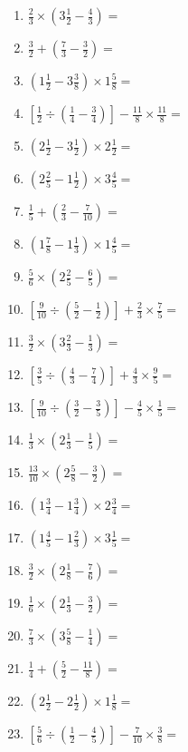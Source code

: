 \documentclass[12pt]{article}
\begin{document}
\begin{enumerate}[ itemsep=1.5cm]
	\item $\displaystyle \frac{2}{3} \times \left( 3 \frac{1}{2} - \frac{4}{3} \right) =$
	\item $\displaystyle \frac{3}{2} + \left( \frac{7}{3} - \frac{3}{2} \right) =$
	\item $\displaystyle \left( 1 \frac{1}{2} - 3 \frac{3}{8} \right) \times 1 \frac{5}{8} =$
	\item $\displaystyle \left[ \frac{1}{2} \div \left( \frac{1}{4} - \frac{3}{4} \right) \right] - \frac{11}{8} \times \frac{11}{8} =$
	\item $\displaystyle \left( 2 \frac{1}{2} - 3 \frac{1}{2} \right) \times 2 \frac{1}{2} =$
	\item $\displaystyle \left( 2 \frac{2}{5} - 1 \frac{1}{2} \right) \times 3 \frac{4}{5} =$
	\item $\displaystyle \frac{1}{5} + \left( \frac{2}{3} - \frac{7}{10} \right) =$
	\item $\displaystyle \left( 1 \frac{7}{8} - 1 \frac{1}{3} \right) \times 1 \frac{4}{5} =$
	\item $\displaystyle \frac{5}{6} \times \left( 2 \frac{2}{5} - \frac{6}{5} \right) =$

	\item $\displaystyle \left[ \frac{9}{10} \div \left( \frac{5}{2} - \frac{1}{2} \right) \right] + \frac{2}{3} \times \frac{7}{5} =$
	\item $\displaystyle \frac{3}{2} \times \left( 3 \frac{2}{3} - \frac{1}{3} \right) =$
	\item $\displaystyle \left[ \frac{3}{5} \div \left( \frac{4}{3} - \frac{7}{4} \right) \right] + \frac{4}{3} \times \frac{9}{5} =$
	\item $\displaystyle \left[ \frac{9}{10} \div \left( \frac{3}{2} - \frac{3}{5} \right) \right] - \frac{4}{5} \times \frac{1}{5} =$
	\item $\displaystyle \frac{1}{3} \times \left( 2 \frac{1}{3} - \frac{1}{5} \right) =$
	\item $\displaystyle \frac{13}{10} \times \left( 2 \frac{5}{8} - \frac{3}{2} \right) =$
	\item $\displaystyle \left( 1 \frac{3}{4} - 1 \frac{3}{4} \right) \times 2 \frac{3}{4} =$
	\item $\displaystyle \left( 1 \frac{4}{5} - 1 \frac{2}{3} \right) \times 3 \frac{1}{5} =$
	\item $\displaystyle \frac{3}{2} \times \left( 2 \frac{1}{8} - \frac{7}{6} \right) =$

	\item $\displaystyle \frac{1}{6} \times \left( 2 \frac{1}{3} - \frac{3}{2} \right) =$
	\item $\displaystyle \frac{7}{3} \times \left( 3 \frac{5}{8} - \frac{1}{4} \right) =$
	\item $\displaystyle \frac{1}{4} + \left( \frac{5}{2} - \frac{11}{8} \right) =$
	\item $\displaystyle \left( 2 \frac{1}{2} - 2 \frac{1}{2} \right) \times 1 \frac{1}{8} =$
	\item $\displaystyle \left[ \frac{5}{6} \div \left( \frac{1}{2} - \frac{4}{5} \right) \right] - \frac{7}{10} \times \frac{3}{8} =$
\end{enumerate}
\end{document}
